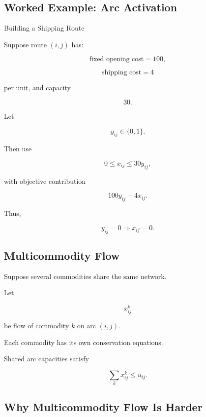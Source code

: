 \subsection{Worked Example: Arc Activation}
\label{subsec:worked-arc-activation}

\begin{workedexamplebox}{Building a Shipping Route}

Suppose route \((i,j)\) has:

\[
\text{fixed opening cost}=100,
\]

\[
\text{shipping cost}=4
\]

per unit, and capacity

\[
30.
\]

Let

\[
y_{ij}\in\{0,1\}.
\]

Then use

\[
0\leq x_{ij}\leq30y_{ij},
\]

with objective contribution

\[
100y_{ij}+4x_{ij}.
\]

Thus,

\begin{answerbox}
\[
\boxed{
y_{ij}=0
\Rightarrow
x_{ij}=0.
}
\]
\end{answerbox}

\end{workedexamplebox}

\subsection{Multicommodity Flow}
\label{subsec:multicommodity-flow}

Suppose several commodities share the same network.

Let

\[
x_{ij}^{k}
\]

be flow of commodity \(k\) on arc \((i,j)\).

Each commodity has its own conservation equations.

Shared arc capacities satisfy

\[
\boxed{
\sum_k
x_{ij}^{k}
\leq
u_{ij}.
}
\]

\subsection{Why Multicommodity Flow Is Harder}
\label{subsec:why-multicommodity-harder}

